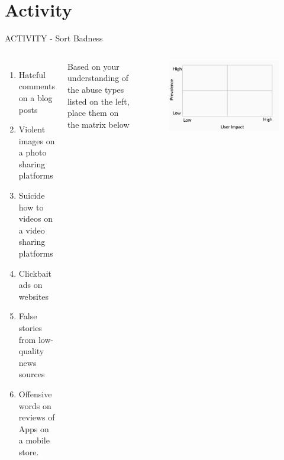 \documentclass[nobackground,dvipsnames,table]{beamer}
\begin{document}
\section{Activity}

\begin{frame}{ACTIVITY - Sort Badness}
    \begin{columns}[T]
            \begin{enumerate}
                \item Hateful comments on a blog posts
                \item Violent images on a photo sharing platforms \item Suicide how to videos on a video sharing platforms
                \item Clickbait ads on websites
                \item False stories from low-quality news sources
                \item Offensive words on reviews of Apps on a mobile store.
            \end{enumerate}
            \vspace{0.025\textheight}
            \small{Based on your understanding of the abuse types listed on the left, place them on the matrix below}
            \vspace{0.12\textheight}
            \begin{figure}
                \centering
                \includegraphics[width=\textwidth]{sort-badness}
            \end{figure}
    \end{columns}
\end{frame}
\end{document}
